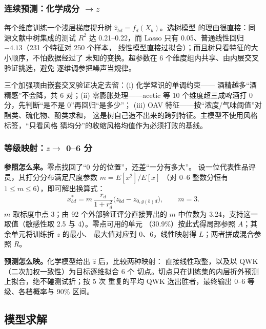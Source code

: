 \documentclass[12pt,a4paper]{article}
\begin{document}

\subsubsection{连续预测：化学成分 $\to z$}

每个维度训练一个浅层梯度提升树 $\hat z_{bd}=f_d(X_b)$。选树模型
的理由很直接：同源文献中树集成的测试 $R^2$ 达 0.21--0.22，而
Lasso 只有 0.05、普通线性回归 $-4.13$（231 个特征对 250 个样本，
线性模型直接过拟合）；而且树只看特征的大小顺序，不怕数据经过了
未知的变换。超参数在 6 个维度组内共享、由内层交叉验证挑选，避免
逐维调参把噪声当规律。

三个加强项由嵌套交叉验证决定去留：(i) 化学常识的单调约束——
酒精越多``酒精感''不会降，共 6 对；(ii) 零膨胀处理——acetic 等
10 个维度超三成啤酒打 0 分，先判断``是不是 0''再回归``是多少''；
(iii) OAV 特征——按``浓度/气味阈值''对酯类、硫化物、酚类求和，
这是树自己造不出来的跨列特征。主模型不使用风格标签，``只看风格
猜均分''的收缩风格均值作为必须打败的基线。

\subsubsection{等级映射：$z\to$ 0--6 分}

\textbf{参照怎么来。}零点找回了``0 分的位置''，还差``一分有多大''。
设一位代表性品评员，其打分分布满足尺度参数 $m=E[x^2]/E[x]$
（对 0--6 整数分恒有 $1\le m\le6$），即可解出换算式：
\begin{equation}
  x^*_{bd}=m\,\frac{r_d}{1+r_d^2}\bigl(z_{bd}-z_{0,g(b)d}\bigr),
  \qquad m=3 .
\end{equation}
$m$ 取标度中点 3；由 92 个外部验证评分直接算出的 $m$ 中位数为
3.24，支持这一取值（敏感性取 2.5 与 4）。零点可用的单元
（30.9\%）按此式得局部参照 $A$；其余单元将训练折 $z$ 的最小、
最大值对应到 0、6，线性映射得 $L$；两者拼成混合参照 $R$。

\textbf{预测怎么映。}化学模型给出 $\hat z$ 后，比较两种映射：
直接线性取整，以及以 QWK（二次加权一致性）为目标逐维拟合 6 个
切点。切点只在训练集的内层折外预测上拟合，绝不碰测试折；按 5 次
重复的平均 QWK 选出胜者，最终输出 0--6 等级、各档概率与 90\%
区间。

\subsection{模型求解}
\end{document}
